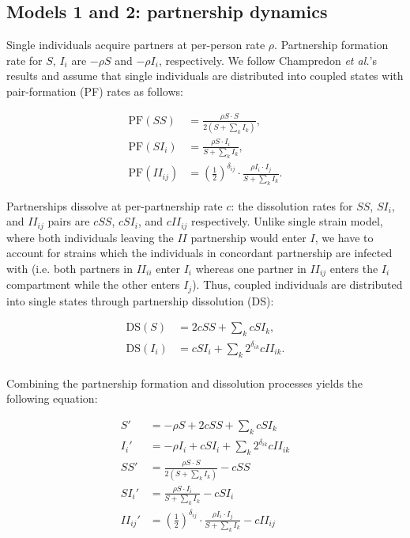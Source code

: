 \documentclass[10pt,letterpaper]{article}
\newcommand{\khalf}{\left(\frac{1}{2}\right)^{\delta_{ij}}}  %
\newcommand{\etal}{\textit{et al.}}
\newcommand{\PF}{\textrm{PF}}
\newcommand{\DS}{\textrm{DS}}
\begin{document}
\subsection*{Models 1 and 2: partnership dynamics}

Single individuals acquire partners at per-person rate $\rho$. Partnership formation rate for $S$, $I_i$ are $- \rho S$ and $-\rho I_i$, respectively. We follow Champredon \etal's results and assume that single individuals are distributed into coupled states with pair-formation (PF) rates as follows:

\begin{equation}
\begin{aligned}
\PF(SS) &= \frac{\rho S \cdot S}{2 (S + \sum_k I_k)},\\
\PF(SI_i) &= \frac{\rho S \cdot I_i}{S + \sum_k I_k},\\
\PF(II_{ij}) &= \khalf \cdot \frac{\rho I_i \cdot I_j}{S + \sum_k I_k}.
\end{aligned}
\end{equation}

Partnerships dissolve at per-partnership rate $c$: the dissolution rates for $SS$, $SI_i$, and $II_{ij}$ pairs are $c SS$, $c SI_i$, and $c II_{ij}$ respectively. Unlike single strain model, where both individuals leaving the $II$ partnership would enter $I$, we have to account for strains which the individuals in concordant partnership are infected with (i.e. both partners in $II_{ii}$ enter $I_i$ whereas one partner in $II_{ij}$ enters the $I_i$ compartment while the other enters $I_j$). Thus, coupled individuals are distributed into single states through partnership dissolution (DS):

\begin{equation}
\begin{aligned}
\DS(S) &= 2 c SS + \sum_k c SI_k, \\
\DS(I_i) &= c SI_i + \sum_k 2^{\delta_{ik}} c II_{ik}.\\
\end{aligned}
\end{equation}

Combining the partnership formation and dissolution processes yields the following equation:

\begin{equation}
\begin{aligned}
S' &= - \rho S + 2 c SS + \sum_k c SI_k \\
I_i' &= - \rho I_i + c SI_i + \sum_k 2^{\delta_{ik}} c II_{ik}\\
SS' &= \frac{\rho S \cdot S}{2 (S + \sum_k I_k)} - c SS\\
SI_i' &= \frac{\rho S \cdot I_i}{S + \sum_k I_k} - c SI_i\\
II_{ij}' &= \khalf \cdot \frac{\rho I_i \cdot I_j}{S + \sum_k I_k} - c II_{ij}
\end{aligned}
\end{equation}
\end{document}
